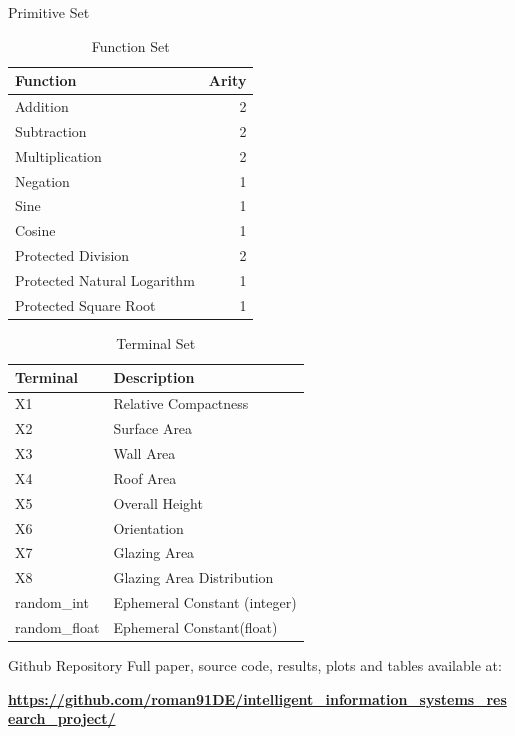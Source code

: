 \documentclass[
  ignorenonframetext,
]{beamer}
\begin{document}
\begin{frame}[allowframebreaks]{Primitive Set}
\protect\hypertarget{primitive-set}{}
\begin{table}

\caption{\label{tab:primitive_table}Function Set}
\centering
\begin{tabular}[t]{l|r}
\hline
Function & Arity\\
\hline
Addition & 2\\
\hline
Subtraction & 2\\
\hline
Multiplication & 2\\
\hline
Negation & 1\\
\hline
Sine & 1\\
\hline
Cosine & 1\\
\hline
Protected Division & 2\\
\hline
Protected Natural Logarithm & 1\\
\hline
Protected Square Root & 1\\
\hline
\end{tabular}
\end{table}
\framebreak

\begin{table}

\caption{\label{tab:function_table}Terminal Set}
\centering
\begin{tabular}[t]{l|l}
\hline
Terminal & Description\\
\hline
X1 & Relative Compactness\\
\hline
X2 & Surface Area\\
\hline
X3 & Wall Area\\
\hline
X4 & Roof Area\\
\hline
X5 & Overall Height\\
\hline
X6 & Orientation\\
\hline
X7 & Glazing Area\\
\hline
X8 & Glazing Area Distribution\\
\hline
random\_int & Ephemeral Constant (integer)\\
\hline
random\_float & Ephemeral Constant(float)\\
\hline
\end{tabular}
\end{table}
\end{frame}

\begin{frame}{Github Repository}
\protect\hypertarget{github-repository}{}
Full paper, source code, results, plots and tables available at:

\textbf{\url{https://github.com/roman91DE/intelligent_information_systems_research_project/}}
\end{frame}
\end{document}
